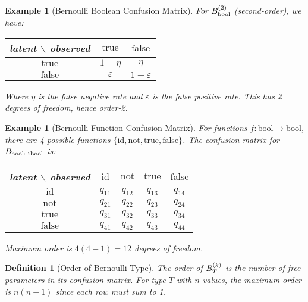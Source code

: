 \documentclass[11pt,final,hidelinks]{article}
\newtheorem{definition}[theorem]{Definition}
\newtheorem{example}[theorem]{Example}
\begin{document}
\begin{example}[Bernoulli Boolean Confusion Matrix]
For $B_{\mathrm{bool}}^{(2)}$ (second-order), we have:

\begin{center}
\begin{tabular}{c|cc}
latent $\backslash$ observed & $\mathrm{true}$ & $\mathrm{false}$ \\
\hline
$\mathrm{true}$ & $1-\eta$ & $\eta$ \\
$\mathrm{false}$ & $\varepsilon$ & $1-\varepsilon$ \\
\end{tabular}
\end{center}

Where $\eta$ is the false negative rate and $\varepsilon$ is the false positive rate. This has 2 degrees of freedom, hence order-2.
\end{example}

\begin{example}[Bernoulli Function Confusion Matrix]
For functions $f: \mathrm{bool} \to \mathrm{bool}$, there are 4 possible functions $\{\mathrm{id}, \mathrm{not}, \mathrm{true}, \mathrm{false}\}$. The confusion matrix for $B_{\mathrm{bool} \mapsto \mathrm{bool}}$ is:

\begin{center}
\begin{tabular}{c|cccc}
latent $\backslash$ observed & $\mathrm{id}$ & $\mathrm{not}$ & $\mathrm{true}$ & $\mathrm{false}$ \\
\hline
$\mathrm{id}$ & $q_{11}$ & $q_{12}$ & $q_{13}$ & $q_{14}$ \\
$\mathrm{not}$ & $q_{21}$ & $q_{22}$ & $q_{23}$ & $q_{24}$ \\
$\mathrm{true}$ & $q_{31}$ & $q_{32}$ & $q_{33}$ & $q_{34}$ \\
$\mathrm{false}$ & $q_{41}$ & $q_{42}$ & $q_{43}$ & $q_{44}$ \\
\end{tabular}
\end{center}

Maximum order is $4(4-1) = 12$ degrees of freedom.
\end{example}

\begin{definition}[Order of Bernoulli Type]
The order of $B_{T}^{(k)}$ is the number of free parameters in its confusion matrix. For type $T$ with $n$ values, the maximum order is $n(n-1)$ since each row must sum to 1.
\end{definition}
\end{document}
